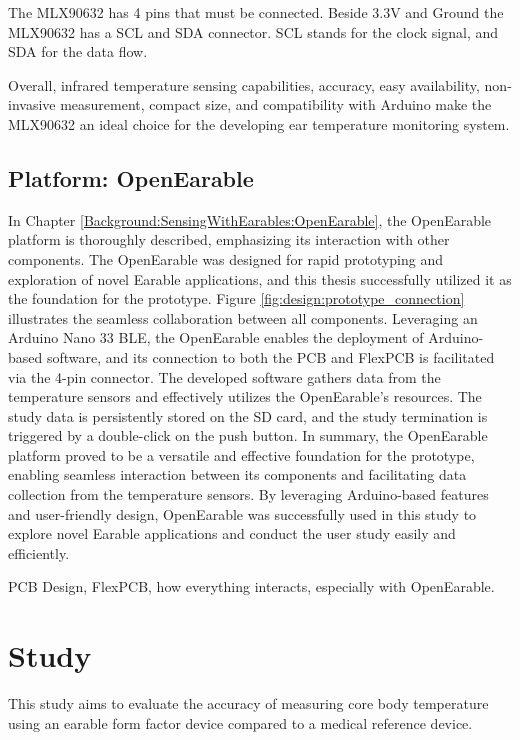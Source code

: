 The MLX90632 has 4 pins that must be connected. Beside 3.3V and Ground the MLX90632 has a SCL and SDA connector. SCL stands for the clock signal, and SDA for the data flow.

Overall, infrared temperature sensing capabilities, accuracy, easy availability, non-invasive measurement, compact size, and compatibility with Arduino make the MLX90632 an ideal choice for the developing ear temperature monitoring system.

\subsection{Platform: OpenEarable}
\label{ch:Design:Prototype:OpenEarable}

In Chapter \ref{Background:SensingWithEarables:OpenEarable}, the OpenEarable platform is thoroughly described, emphasizing its interaction with other components. 
The OpenEarable was designed for rapid prototyping and exploration of novel Earable applications, and this thesis successfully utilized it as the foundation for the prototype. 
Figure \ref{fig:design:prototype_connection} illustrates the seamless collaboration between all components. 
Leveraging an Arduino Nano 33 BLE, the OpenEarable enables the deployment of Arduino-based software, and its connection to both the PCB and FlexPCB is facilitated via the 4-pin connector. 
The developed software gathers data from the temperature sensors and effectively utilizes the OpenEarable's resources. 
The study data is persistently stored on the SD card, and the study termination is triggered by a double-click on the push button.
In summary, the OpenEarable platform proved to be a versatile and effective foundation for the prototype, enabling seamless interaction between its components and facilitating data collection from the temperature sensors. 
By leveraging Arduino-based features and user-friendly design, OpenEarable was successfully used in this study to explore novel Earable applications and conduct the user study easily and efficiently.


PCB Design, FlexPCB, how everything interacts, especially with OpenEarable.

\section{Study}
\label{ch:Design:Study}
This study aims to evaluate the accuracy of measuring core body temperature using an earable form factor device compared to a medical reference device.

